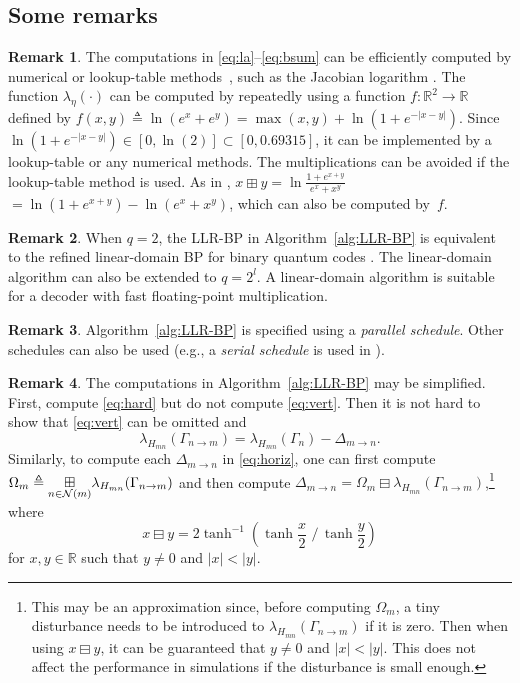 \documentclass{ieeeaccess}
\newcommand{\teq}{\triangleq}
\newcommand{\sN}{{\cal N}}
\newcommand{\RR}{{\mathbb R}}
\let\emph\textit
\theoremstyle{definition}		%
\newtheorem{remark}{Remark}
\begin{document}
\subsection{Some remarks}
 

\begin{remark} \label{rmk:tbl}
	The computations in \eqref{eq:la}--\eqref{eq:bsum} can be efficiently computed by numerical or lookup-table methods~\cite{Gal63}, such as the Jacobian logarithm \cite{RVH95,HOP96,HEAD01,WSM04}.
		The function $\lambda_\eta(\cdot)$ can be computed by repeatedly using a function ${ f:\RR^2\to \RR }$ defined by
		$ f(x,y) \triangleq \ln(e^x+e^y) = \max(x,y) +  \ln(1+e^{-|x-y|}) $.
		Since  $\ln(1+e^{-|x-y|})\in [0, \ln(2)] \subset [0, 0.69315]$, it can be implemented by a lookup-table or any numerical methods.
		The multiplications can be avoided if the lookup-table method is used.
		As in \cite{HOP96}, $x\boxplus y = \ln\frac{1+e^{x+y}}{e^x+x^y}$ $= \ln(1+e^{x+y}) - \ln(e^x+x^y)$, which can also be computed by~$f$.
\end{remark}


\begin{remark} \label{rmk:eq}
	When $q=2$, the LLR-BP in Algorithm~\ref{alg:LLR-BP} is equivalent to the refined linear-domain BP for binary quantum codes \cite[Algorithm~3]{KL20}. 
	The linear-domain algorithm can also be extended to $q=2^{l}$. %
	A linear-domain algorithm is suitable for a decoder with fast floating-point multiplication.
\end{remark}

\begin{remark} \label{rmk:sch}
	Algorithm~\ref{alg:LLR-BP} is specified using a \emph{parallel schedule}. Other schedules can also be used (e.g.,  a \emph{serial schedule} is used in \cite[Algorithms~2 and~4]{KL20}). 
\end{remark}


\begin{remark} \label{rmk:cmpx0}
	The computations in Algorithm~\ref{alg:LLR-BP} may be simplified. First, compute \eqref{eq:hard} but do not compute \eqref{eq:vert}.
	Then it is not hard to show that \eqref{eq:vert} can be omitted and
	\begin{equation} \label{eq:simp}
	\lambda_{H_{mn}}(\Gamma_{n\to m}) = \lambda_{H_{mn}}(\Gamma_n) - \Delta_{m\to n}.
	\end{equation}	
	Similarly, to compute each $\Delta_{m\to n}$ in \eqref{eq:horiz}, one can first compute 
	$\Omega_m \teq \underset{n\in\sN(m)}{\boxplus} \lambda_{H_{mn}}(\Gamma_{n\to m})$ 
	and then compute 
	$\Delta_{m\to n} = \Omega_m \boxminus \lambda_{H_{mn}}(\Gamma_{n\to m})$,\footnote{
		This may be an approximation since, %
			before computing $\Omega_m$,
			a tiny disturbance needs to be introduced to $\lambda_{H_{mn}}(\Gamma_{n\to m})$ if it is zero.
		Then when using $x\boxminus y$, it can be guaranteed that $y\ne 0$ and $|x|<|y|$.
		This does not affect the performance in simulations if the disturbance is small enough. 
		}
	where 
	\[
	x \boxminus y  = 2\tanh^{-1}\left( \tanh\frac{x}{2} \,\,/\, \tanh\frac{y}{2} \right) 
	\]
	for $x,y\in\RR$ such that $y\ne 0$ and $|x|<|y|$.
\end{remark}
\end{document}
